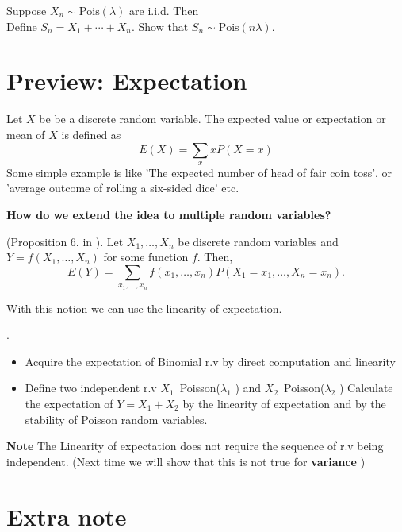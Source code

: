 \begin{exercise}
    Suppose $X_n\sim\text{Pois}(\lambda)$ are i.i.d. Then\\
    Define $S_n=X_1+\cdots+X_n$. Show that $S_n\sim\text{Pois}(n\lambda)$.\\
\end{exercise}





\section{Preview: Expectation}
Let \(X\) be be a discrete random variable. The expected value or expectation or mean of \(X\) is defined as
\[
    E(X) = \sum_{x} x P(X=x)
\]
Some simple example is like 'The expected number of head of fair coin toss', or 'average outcome of rolling a six-sided dice' etc. 

\textbf{How do we extend the idea to multiple random variables?}

\begin{theorem*}
   (Proposition 6. in \cite{Und_Chatterjee}). Let \(X_1,\dots , X_n\) be discrete random variables and 
   \(Y =f(X_1,\dots, X_n) \) for some function \(f\). Then,
   \[
    E(Y) = \sum_{x_1,\dots,x_n}f(x_1,\dots,x_n) P(X_1 = x_1, \dots, X_n = x_n).
   \] 
\end{theorem*}
With this notion we can use the linearity of expectation.

\begin{exercise}
    .\\
    \begin{itemize}
        \item Acquire the expectation of Binomial r.v by direct computation and linearity
        \item Define two independent r.v \(X_1\)~Poisson(\(\lambda_1  \) ) and \(X_2\)~Poisson(\(\lambda_2 \) )  Calculate the expectation of \(Y = X_1 + X_2\) by the linearity of expectation and by the stability of Poisson random variables.
    \end{itemize}
\end{exercise}
\textbf{Note} The Linearity of expectation does not require the sequence of r.v being independent. (Next time we will show that this is not true for \textbf{variance} )

\section{Extra note}
